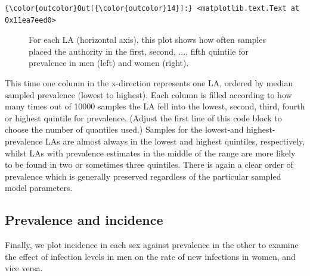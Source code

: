 \documentclass{article}
\begin{document}
    \begin{footnotesize}
            \begin{Verbatim}[commandchars=\\\{\}]
{\color{outcolor}Out[{\color{outcolor}14}]:} <matplotlib.text.Text at 0x11ea7eed0>
\end{Verbatim}
    \end{footnotesize}
        
    \begin{figure}
        \begin{center}\end{center}
        \caption{For each LA (horizontal axis), this plot shows how often samples placed the authority in the first, second, ..., fifth quintile for prevalence in men (left) and women (right).}
        \label{}
    \end{figure}
    
    This time one column in the x-direction represents one LA, ordered by
median sampled prevalence (lowest to highest). Each column is filled
according to how many times out of 10000 samples the LA fell into the
lowest, second, third, fourth or highest quintile for prevalence.
(Adjust the first line of this code block to choose the number of
quantiles used.) Samples for the lowest-and highest-prevalence LAs are
almost always in the lowest and highest quintiles, respectively, whilst
LAs with prevalence estimates in the middle of the range are more likely
to be found in two or sometimes three quintiles. There is again a clear
order of prevalence which is generally preserved regardless of the
particular sampled model parameters.

    \subsection{Prevalence and incidence}\label{prevalence-and-incidence}

Finally, we plot incidence in each sex against prevalence in the other
to examine the effect of infection levels in men on the rate of new
infections in women, and vice versa.
\end{document}

